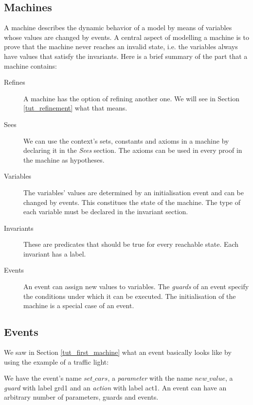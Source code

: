 \subsection{Machines}
\label{tut_machines}

A machine describes the dynamic behavior of a model by means of
variables whose values are changed by events.
A central aspect of modelling a machine is to prove that the machine
never reaches an invalid state, i.e. the variables always have values
that satisfy the invariants.
Here is a brief summary of the part that a machine contains:

\begin{description}
\item[Refines]  A machine has the option of refining another one.
  We will see in Section \ref{tut_refinement} what that means.
\item[Sees]  We can use the context's sets, constants and axioms  in
  a machine by declaring it in the \textsl{Sees} section.
  The axioms can be used in every proof in the machine as hypotheses.
\item[Variables] 
  The variables' values are determined by an initialisation event and
  can be changed by events. This constitues the state of the machine. The type of each variable must be declared in the invariant section.
\item[Invariants] 
  These are predicates that should be true for every reachable state.
  Each invariant has a label.
\item[Events] 
  An event can assign new values to variables.
  The \emph{guards} of an event specify the conditions under which it can be executed.
  The initialisation of the machine is a special case of an event.
\end{description}

\subsection{Events}
\label{tut_events}

We saw in Section \ref{tut_first_machine} what an event basically looks like by using the example of a traffic light:
\begin{description}
		\begin{description}
		\AnyPrm
			\begin{description}
			\end{description}
		\WhereGrd
			\begin{description}
			\nItemX{ grd1 }{ new\_value \in  BOOL }
			\end{description}
		\ThenAct
			\begin{description}
			\nItemX{ act1 }{ cars\_go :=  new\_value }
			\end{description}
		\EndAct
		\end{description}
\end{description}
We have the event's name $set\_cars$, a \emph{parameter} with the name $new\_value$,
a \emph{guard} with label grd1 and an \emph{action} with label act1.
An event can have an arbitrary number of parameters, guards and events.

